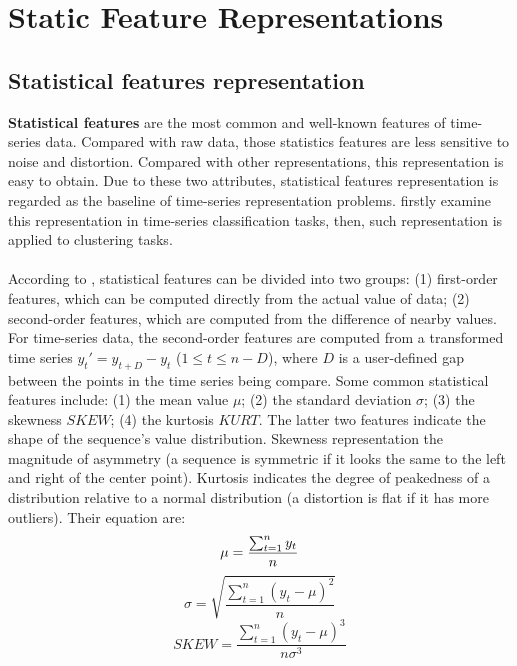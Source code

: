 \section{Static Feature Representations}

\subsection{Statistical features representation}
\label{sec:statistical}
\textbf{Statistical features} are the most common and well-known features of time-series data. Compared with raw data, those statistics features are less sensitive to noise and distortion. Compared with other representations, this representation is easy to obtain. Due to these two attributes, statistical features representation is regarded as the baseline of time-series representation problems. \cite{nanopoulos2001feature} firstly examine this representation in time-series classification tasks, then, such representation is applied to clustering tasks. \\
\\According to \cite{nanopoulos2001feature}, statistical features can be divided into two groups: (1) first-order features, which can be computed directly from the actual value of data; (2) second-order features, which are computed from the difference of nearby values. For time-series data, the second-order features are computed from a transformed time series $y_t\prime = y_{t+D} - y_t$ ($1 \le t \leq n-D$), where $D$ is a user-defined gap between the points in the time series being compare. Some common statistical features include: (1) the mean value $\mu$; (2) the standard deviation $\sigma$; (3) the skewness $SKEW$; (4) the kurtosis $KURT$. The latter two features indicate the shape of the sequence's value distribution. Skewness representation the magnitude of asymmetry (a sequence is symmetric if it looks the same to the left and right of the center point). Kurtosis indicates the degree of peakedness of a distribution relative to a normal distribution (a distortion is flat if it has more outliers). Their equation are:
\begin{equation} 
    \mu = \frac{\sum_{t=1}^n y_t}{n} \\
\end{equation}
\begin{equation} 
    \sigma = \sqrt{\frac{\sum_{t=1}^n (y_t - \mu)^2}{n}}
\end{equation}
\begin{equation}
    SKEW = \frac{\sum_{t=1}^n (y_t-\mu)^3}{n\sigma^3}
\end{equation}
